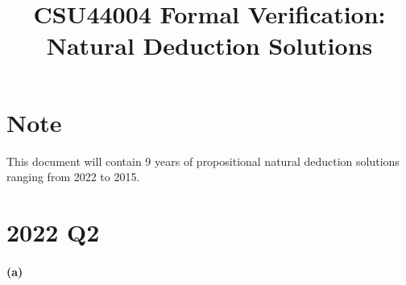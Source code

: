 \documentclass{article} %
\title{CSU44004 Formal Verification: Natural Deduction Solutions}
\date{} %
\begin{document}
\maketitle

\section*{Note}

This document will contain 9 years of propositional natural deduction solutions ranging from 2022 to 2015.

\section*{2022 Q2}

\paragraph{(a)}
\end{document}
